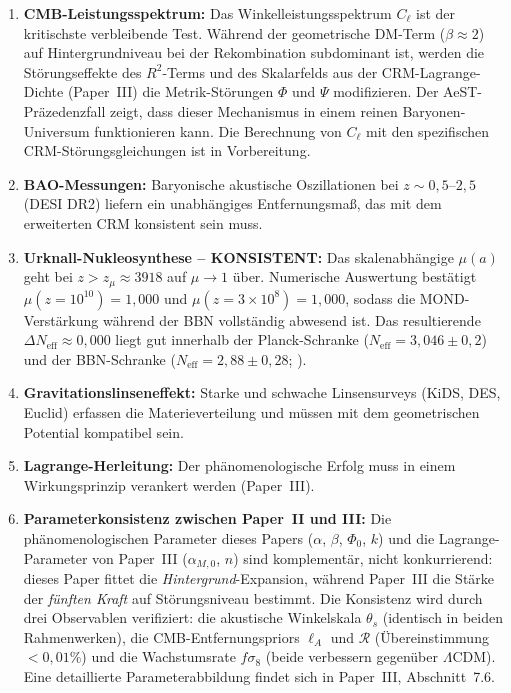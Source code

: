 \documentclass[aps,prd,twocolumn,superscriptaddress,nofootinbib]{revtex4-2}
\begin{document}
\begin{enumerate}
\item \textbf{CMB-Leistungsspektrum:} Das Winkelleistungsspektrum $C_\ell$ ist der kritischste verbleibende Test. W\"ahrend der geometrische DM-Term ($\beta \approx 2$) auf Hintergrundniveau bei der Rekombination subdominant ist, werden die St\"orungseffekte des $R^2$-Terms und des Skalarfelds aus der CRM-Lagrange-Dichte (Paper~III) die Metrik-St\"orungen $\Phi$ und $\Psi$ modifizieren. Der AeST-Pr\"azedenzfall \cite{Skordis2021} zeigt, dass dieser Mechanismus in einem reinen Baryonen-Universum funktionieren kann. Die Berechnung von $C_\ell$ mit den spezifischen CRM-St\"orungsgleichungen ist in Vorbereitung.

\item \textbf{BAO-Messungen:} Baryonische akustische Oszillationen bei $z \sim 0{,}5$--$2{,}5$ (DESI DR2) liefern ein unabh\"angiges Entfernungsma\ss{}, das mit dem erweiterten CRM konsistent sein muss.

\item \textbf{Urknall-Nukleosynthese -- KONSISTENT:} Das skalenabh\"angige $\mu(a)$ geht bei $z > z_\mu \approx 3918$ auf $\mu \to 1$ \"uber. Numerische Auswertung best\"atigt $\mu(z = 10^{10}) = 1{,}000$ und $\mu(z = 3 \times 10^8) = 1{,}000$, sodass die MOND-Verst\"arkung w\"ahrend der BBN vollst\"andig abwesend ist. Das resultierende $\Delta N_{\mathrm{eff}} \approx 0{,}000$ liegt gut innerhalb der Planck-Schranke ($N_{\mathrm{eff}} = 3{,}046 \pm 0{,}2$) und der BBN-Schranke ($N_{\mathrm{eff}} = 2{,}88 \pm 0{,}28$; \cite{Pitrou2018}).

\item \textbf{Gravitationslinseneffekt:} Starke und schwache Linsensurveys (KiDS, DES, Euclid) erfassen die Materieverteilung und m\"ussen mit dem geometrischen Potential kompatibel sein.

\item \textbf{Lagrange-Herleitung:} Der ph\"anomenologische Erfolg muss in einem Wirkungsprinzip verankert werden (Paper~III).

\item \textbf{Parameterkonsistenz zwischen Paper~II und III:} Die ph\"anomenologischen Parameter dieses Papers ($\alpha$, $\beta$, $\Phi_0$, $k$) und die Lagrange-Parameter von Paper~III ($\alpha_{M,0}$, $n$) sind komplement\"ar, nicht konkurrierend: dieses Paper fittet die \textit{Hintergrund}-Expansion, w\"ahrend Paper~III die St\"arke der \textit{f\"unften Kraft} auf St\"orungsniveau bestimmt. Die Konsistenz wird durch drei Observablen verifiziert: die akustische Winkelskala $\theta_s$ (identisch in beiden Rahmenwerken), die CMB-Entfernungspriors $\ell_A$ und $\mathcal{R}$ (\"Ubereinstimmung $<0{,}01\%$) und die Wachstumsrate $f\sigma_8$ (beide verbessern gegen\"uber $\Lambda$CDM). Eine detaillierte Parameterabbildung findet sich in Paper~III, Abschnitt~7.6.
\end{enumerate}
\end{document}
